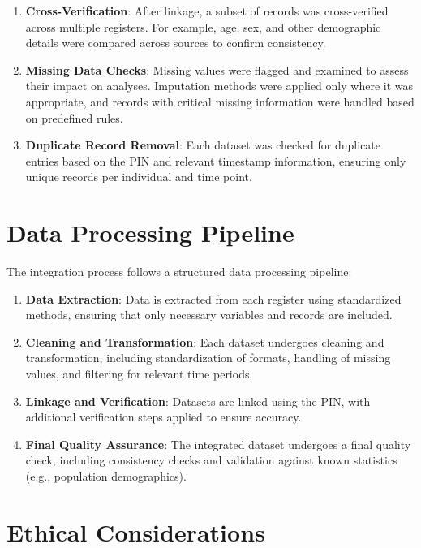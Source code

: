 \documentclass[
]{book}
\providecommand{\tightlist}{%
  \setlength{\itemsep}{0pt}\setlength{\parskip}{0pt}}
\begin{document}
\begin{enumerate}
\def\labelenumi{\arabic{enumi}.}
\tightlist
\item
  \textbf{Cross-Verification}: After linkage, a subset of records was cross-verified across multiple registers. For example, age, sex, and other demographic details were compared across sources to confirm consistency.
\item
  \textbf{Missing Data Checks}: Missing values were flagged and examined to assess their impact on analyses. Imputation methods were applied only where it was appropriate, and records with critical missing information were handled based on predefined rules.
\item
  \textbf{Duplicate Record Removal}: Each dataset was checked for duplicate entries based on the PIN and relevant timestamp information, ensuring only unique records per individual and time point.
\end{enumerate}

\hypertarget{data-processing-pipeline}{%
\section{Data Processing Pipeline}\label{data-processing-pipeline}}

The integration process follows a structured data processing pipeline:

\begin{enumerate}
\def\labelenumi{\arabic{enumi}.}
\tightlist
\item
  \textbf{Data Extraction}: Data is extracted from each register using standardized methods, ensuring that only necessary variables and records are included.
\item
  \textbf{Cleaning and Transformation}: Each dataset undergoes cleaning and transformation, including standardization of formats, handling of missing values, and filtering for relevant time periods.
\item
  \textbf{Linkage and Verification}: Datasets are linked using the PIN, with additional verification steps applied to ensure accuracy.
\item
  \textbf{Final Quality Assurance}: The integrated dataset undergoes a final quality check, including consistency checks and validation against known statistics (e.g., population demographics).
\end{enumerate}

\hypertarget{ethical-considerations}{%
\section{Ethical Considerations}\label{ethical-considerations}}
\end{document}
